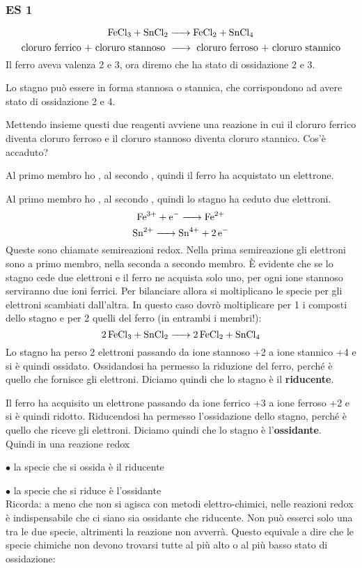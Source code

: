 \subsubsection{\textbf{ES 1}}
$$\ce{FeCl_3 + SnCl_2 -> FeCl_2 + SnCl_4}$$
$$\text{cloruro ferrico + cloruro stannoso \ce{->} cloruro ferroso + cloruro stannico}$$
Il ferro aveva valenza 2 e 3, ora diremo che ha stato di ossidazione 2 e 3.

Lo stagno può essere in forma stannosa o stannica, che corrispondono ad avere stato di ossidazione 2 e 4.

Mettendo insieme questi due reagenti avviene una reazione in cui il cloruro ferrico diventa cloruro ferroso e il cloruro stannoso diventa cloruro stannico. Cos'è accaduto?

Al primo membro ho , al secondo , quindi il ferro ha acquistato un elettrone.

Al primo membro ho , al secondo , quindi lo stagno ha ceduto due elettroni.
$$\ce{Fe^{3+} + e^- -> Fe^{2+}}$$
$$\ce{Sn^{2+} -> Sn^{4+} + 2 e^-}$$
Queste sono chiamate semireazioni redox.
Nella prima semireazione gli elettroni sono a primo membro, nella seconda a secondo membro.
È evidente che se lo stagno cede due elettroni e il ferro ne acquista solo uno, per ogni ione stannoso serviranno due ioni ferrici.
Per bilanciare allora si moltiplicano le specie per gli elettroni scambiati dall'altra.
In questo caso dovrò moltiplicare per 1 i composti dello stagno e per 2 quelli del ferro (in entrambi i membri!):
$$\ce{2 FeCl_3 + SnCl_2 -> 2 FeCl_2 + SnCl_4}$$
Lo stagno ha perso 2 elettroni passando da ione stannoso +2 a ione stannico +4 e si è quindi ossidato. Ossidandosi ha permesso la riduzione del ferro, perché è quello che fornisce gli elettroni. Diciamo quindi che lo stagno è il \textbf{riducente}.

Il ferro ha acquisito un elettrone passando da ione ferrico +3 a ione ferroso +2 e si è quindi ridotto. Riducendosi ha permesso l'ossidazione dello stagno, perché è quello che riceve gli elettroni. Diciamo quindi che lo stagno è l'\textbf{ossidante}.\\

Quindi in una reazione redox

$\bullet$ la specie che si ossida è il riducente

$\bullet$ la specie che si riduce è l'ossidante\\

Ricorda: a meno che non si agisca con metodi elettro-chimici, nelle reazioni redox è indispensabile che ci siano sia ossidante che riducente. Non può esserci solo una tra le due specie, altrimenti la reazione non avverrà. Questo equivale a dire che le specie chimiche non devono trovarsi tutte al più alto o al più basso stato di ossidazione:

